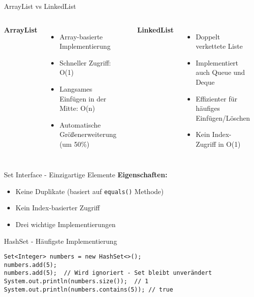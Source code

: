\begin{frame}[fragile]{ArrayList vs LinkedList}
  \begin{columns}[T]
    \textbf{ArrayList}
    \begin{itemize}
      \item Array-basierte Implementierung
      \item Schneller Zugriff: O(1)
      \item Langsames Einfügen in der Mitte: O(n)
      \item Automatische Größenerweiterung (um 50\%)
    \end{itemize}

    \begin{lstlisting}[style=java, basicstyle=\footnotesize\ttfamily]
List<Integer> numbers = new ArrayList<>();
numbers.add(1);
numbers.add(2);
numbers.add(1, 5); // [1, 5, 2]
    \end{lstlisting}

    \textbf{LinkedList}
    \begin{itemize}
      \item Doppelt verkettete Liste
      \item Implementiert auch Queue und Deque
      \item Effizienter für häufiges Einfügen/Löschen
      \item Kein Index-Zugriff in O(1)
    \end{itemize}

    \begin{lstlisting}[style=java, basicstyle=\footnotesize\ttfamily]
LinkedList<String> words = new LinkedList<>();
words.add("first");
words.addFirst("start"); // [start, first]
words.addLast("end");    // [start, first, end]
    \end{lstlisting}
  \end{columns}
\end{frame}

\begin{frame}[fragile]{Set Interface - Einzigartige Elemente}
  \textbf{Eigenschaften:}
  \begin{itemize}
    \item Keine Duplikate (basiert auf \texttt{equals()} Methode)
    \item Kein Index-basierter Zugriff
    \item Drei wichtige Implementierungen
  \end{itemize}

  \begin{exampleblock}{HashSet - Häufigste Implementierung}
    \begin{lstlisting}[style=java, basicstyle=\small\ttfamily]
Set<Integer> numbers = new HashSet<>();
numbers.add(5);
numbers.add(5);  // Wird ignoriert - Set bleibt unverändert
System.out.println(numbers.size());  // 1
System.out.println(numbers.contains(5)); // true
    \end{lstlisting}
  \end{exampleblock}
\end{frame}

